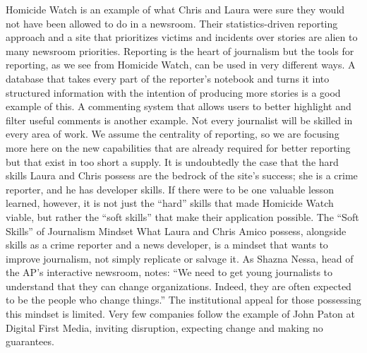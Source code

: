 Homicide Watch is an example of what Chris and Laura were sure they would
not have been allowed to do in a newsroom. Their statistics-driven reporting
approach and a site that prioritizes victims and incidents over stories are alien to
many newsroom priorities.
Reporting is the heart of journalism but the tools for reporting, as we see from
Homicide Watch, can be used in very different ways. A database that takes every
part of the reporter’s notebook and turns it into structured information with the
intention of producing more stories is a good example of this. A commenting
system that allows users to better highlight and filter useful comments is another
example. Not every journalist will be skilled in every area of work. We assume
the centrality of reporting, so we are focusing more here on the new capabilities
that are already required for better reporting but that exist in too short a supply.
It is undoubtedly the case that the hard skills Laura and Chris possess are the
bedrock of the site’s success; she is a crime reporter, and he has developer skills.
If there were to be one valuable lesson learned, however, it is not just the ``hard''
skills that made Homicide Watch viable, but rather the ``soft skills'' that make
their application possible.
The ``Soft Skills'' of Journalism
Mindset
What Laura and Chris Amico possess, alongside skills as a crime reporter and a
news developer, is a mindset that wants to improve journalism, not simply replicate
or salvage it. As Shazna Nessa, head of the AP’s interactive newsroom, notes:
``We need to get young journalists to understand that they can change organizations.
Indeed, they are often expected to be the people who change things.''
The institutional appeal for those possessing this mindset is limited. Very few
companies follow the example of John Paton at Digital First Media, inviting
disruption, expecting change and making no guarantees.

